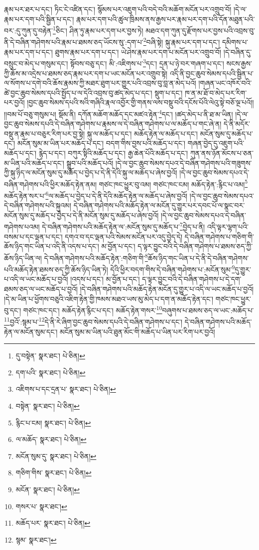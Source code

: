 རྣམ་པར་ཐར་པ་དང་། ཏིང་ངེ་འཛིན་དང་། སྙོམས་པར་འཇུག་པའི་བདེ་བའི་མཆོག་མངོན་པར་འགྲུབ་བོ། །དེ་ལ་རྣམ་པར་དག་པའི་སྦྱིན་པ་དང་། རྣམ་པར་དག་པའི་ཚུལ་ཁྲིམས་ནས་རྒྱས་པར་རྣམ་པར་དག་པའི་དོན་མཐུན་པའི་བར་:དུ་ཀུན་དུ་བརྟེན་\footnote{དུ་བསྟེན་  སྣར་ཐང་།  པེ་ཅིན། }ཅིང་། ཤིན་ཏུ་རྣམ་པར་དག་པར་བྱས་ཏེ། མཐའ་དག་ཀུན་དུ་རྫོགས་པར་བྱས་པའི་འབྲས་བུ་ནི་དེ་བཞིན་གཤེགས་པའི་རྣམ་པ་ཐམས་ཅད་ཡོངས་སུ་:དག་པ་\footnote{དག་པའི་  སྣར་ཐང་།  པེ་ཅིན། }བཞི་སྟེ། སྐུ་རྣམ་པར་དག་པ་དང་། དམིགས་པ་རྣམ་པར་དག་པ་དང་། ཐུགས་རྣམ་པར་དག་པ་དང་། ཡེ་ཤེས་རྣམ་པར་དག་པ་མངོན་པར་འགྲུབ་བོ། །དེ་བཞིན་དུ་བསྲུང་བ་མེད་པ་གསུམ་དང་། སྟོབས་བཅུ་དང་། མི་:འཇིགས་པ་\footnote{འཇིགས་པ་དང་དྲན་པ་  སྣར་ཐང་།  པེ་ཅིན། }དང་། དྲན་པ་ཉེ་བར་གཞག་པ་དང་། སངས་རྒྱས་ཀྱི་ཆོས་མ་འདྲེས་པ་ཐམས་ཅད་རྣམ་པར་དག་པ་ཡང་མངོན་པར་འགྲུབ་སྟེ། འདི་ནི་བྱང་ཆུབ་སེམས་དཔའི་སྦྱིན་པ་ལ་སོགས་པ་དགེ་བའི་ཆོས་རྣམས་ཀྱི་མཐར་ཐུག་པར་གྱུར་པའི་འབྲས་བུ་བླ་ན་མེད་པའོ། །གཞན་ཡང་འཁོར་བའི་ཚེ་བྱང་ཆུབ་སེམས་དཔའི་སྤྱོད་པ་ལ་དེའི་འབྲས་བུ་ཚད་མེད་པ་དང་། སྡུག་པ་དང་། ཁ་ན་མ་ཐོ་བ་མེད་པར་རིག་པར་བྱའོ། །བྱང་ཆུབ་སེམས་དཔའི་སའི་གཞིའི་རྣལ་འབྱོར་གྱི་གནས་ལས་བསྡུ་བའི་དངོས་པོའི་ལེའུ་སྟེ་བཅོ་ལྔ་པའོ།། །།བམ་པོ་བཅུ་གསུམ་པ། སྡོམ་ནི། དཀོན་མཆོག་མཆོད་དང་མཛའ་རྟེན་\footnote{བསྟེན་  སྣར་ཐང་།  པེ་ཅིན། }དང་། །ཚད་མེད་པ་ནི་ཐ་མ་ཡིན། །དེ་ལ་བྱང་ཆུབ་སེམས་དཔའི་དེ་བཞིན་གཤེགས་པ་རྣམས་ལ་དེ་བཞིན་གཤེགས་པ་ལ་མཆོད་པ་གང་ཞེ་ན། དེ་ནི་མདོར་བསྡུ་ན་རྣམ་པ་བཅུར་རིག་པར་བྱ་སྟེ། སྐུ་ལ་མཆོད་པ་དང་། མཆོད་རྟེན་ལ་མཆོད་པ་དང་། མངོན་སུམ་དུ་མཆོད་པ་དང་། མངོན་སུམ་མ་ཡིན་པར་མཆོད་པ་དང་། བདག་གིས་བྱས་པའི་མཆོད་པ་དང་། གཞན་བྱེད་དུ་འཇུག་པའི་མཆོད་པ་དང་། རྙེད་པ་དང་། བཀུར་སྟིའི་མཆོད་པ་དང་། རྒྱ་ཆེན་པོའི་མཆོད་པ་དང་། ཀུན་ནས་ཉོན་མོངས་པ་ཅན་མ་ཡིན་པའི་མཆོད་པ་དང་། སྒྲུབ་པའི་མཆོད་པའོ། །དེ་ལ་བྱང་ཆུབ་སེམས་དཔའ་དེ་བཞིན་གཤེགས་པའི་གཟུགས་ཀྱི་སྐུ་ཉིད་ལ་མངོན་སུམ་དུ་མཆོད་པ་བྱེད་པ་དེ་ནི་དེའི་སྐུ་ལ་མཆོད་པ་ཞེས་བྱའོ། །དེ་ལ་བྱང་ཆུབ་སེམས་དཔའ་དེ་བཞིན་གཤེགས་པའི་ཕྱིར་མཆོད་རྟེན་ནམ། གཙང་ཁང་ཕྱུར་བུ་འམ། གཙང་ཁང་ངམ། མཆོད་རྟེན་:རྙིང་པ་འམ།\footnote{རྙིང་པ་ངམ།  སྣར་ཐང་།  པེ་ཅིན། } མཆོད་རྟེན་སར་པ་\footnote{ལ་མཆོད་  སྣར་ཐང་།  པེ་ཅིན། }ལ་མཆོད་པ་བྱེད་པ་དེ་ནི་དེའི་མཆོད་རྟེན་ལ་མཆོད་པ་ཞེས་བྱའོ། །དེ་ལ་བྱང་ཆུབ་སེམས་དཔའ་དེ་བཞིན་གཤེགས་པའི་སྐུའམ། དེ་བཞིན་གཤེགས་པའི་མཆོད་རྟེན་ལ་མངོན་དུ་གྱུར་པར་དབང་པོ་ལ་སྣང་བར་མངོན་སུམ་དུ་མཆོད་པ་བྱེད་པ་དེ་ནི་མངོན་སུམ་དུ་མཆོད་པ་ཞེས་བྱའོ། །དེ་ལ་བྱང་ཆུབ་སེམས་དཔའ་དེ་བཞིན་གཤེགས་པའམ། དེ་བཞིན་གཤེགས་པའི་མཆོད་རྟེན་ལ་:མངོན་སུམ་དུ་མཆོད་པ་\footnote{མངོན་སུམ་དུ་  སྣར་ཐང་།  པེ་ཅིན། }བྱེད་པ་ནི། འདི་ལྟར་ལྷག་པའི་བསམ་པ་དང་ལྡན་པ་དང་། དགའ་བ་དང་ལྡན་པའི་སེམས་མངོན་པར་འདུ་བྱེད་དེ། དེ་བཞིན་གཤེགས་པ་གཅིག་གི་ཆོས་ཉིད་གང་ཡིན་པ་འདི་ནི་འདས་པ་དང་། མ་བྱོན་པ་དང་། ད་ལྟར་བྱུང་བའི་དེ་བཞིན་གཤེགས་པ་ཐམས་ཅད་ཀྱི་ཆོས་ཉིད་ཡིན་ལ། དེ་བཞིན་གཤེགས་པའི་མཆོད་རྟེན་:གཅིག་གི་\footnote{གཅིག་གིས་  སྣར་ཐང་།  པེ་ཅིན། }ཆོས་ཉིད་གང་ཡིན་པ་དེ་ནི་དེ་བཞིན་གཤེགས་པའི་མཆོད་རྟེན་ཐམས་ཅད་ཀྱི་ཆོས་ཉིད་ཡིན་ཏེ། དེའི་ཕྱིར་བདག་གིས་དེ་བཞིན་གཤེགས་པ་:མངོན་སུམ་\footnote{མངོན་  སྣར་ཐང་།  པེ་ཅིན། }དུ་གྱུར་པ་འདི་ལ་ཡང་མཆོད་པ་བྱའོ། །འདས་པ་དང་། མ་བྱོན་པ་དང་། ད་ལྟར་བྱུང་བའི་དེ་བཞིན་གཤེགས་པ་དེ་དག་ཐམས་ཅད་ལ་ཡང་མཆོད་པ་བྱའོ། །དེ་བཞིན་གཤེགས་པའི་མཆོད་རྟེན་མངོན་དུ་གྱུར་པ་འདི་ལ་ཡང་མཆོད་པ་བྱའོ། །དེ་མ་ཡིན་པ་ཕྱོགས་བཅུའི་འཇིག་རྟེན་གྱི་ཁམས་མཐའ་ཡས་མུ་མེད་པ་དག་ན་མཆོད་རྟེན་དང་། གཙང་ཁང་ཕྱུར་བུ་དང་། གཙང་ཁང་དང་། མཆོད་རྟེན་རྙིང་པ་དང་། མཆོད་རྟེན་གསར་\footnote{གསར་པ་  སྣར་ཐང་། }བཞུགས་པ་ཐམས་ཅད་ལ་ཡང་:མཆོད་པ་\footnote{མཆོད་པར་  སྣར་ཐང་།  པེ་ཅིན། }བྱའོ་:སྙམ་པ་\footnote{སྙམ་  སྣར་ཐང་། }དེ་ནི་རེ་ཞིག་བྱང་ཆུབ་སེམས་དཔའི་དེ་བཞིན་གཤེགས་པ་དང་། དེ་བཞིན་གཤེགས་པའི་མཆོད་རྟེན་ལ་མངོན་སུམ་དང་། མངོན་སུམ་མ་ཡིན་པའི་ཐུན་མོང་གི་མཆོད་པ་ཡིན་པར་རིག་པར་བྱའོ། 